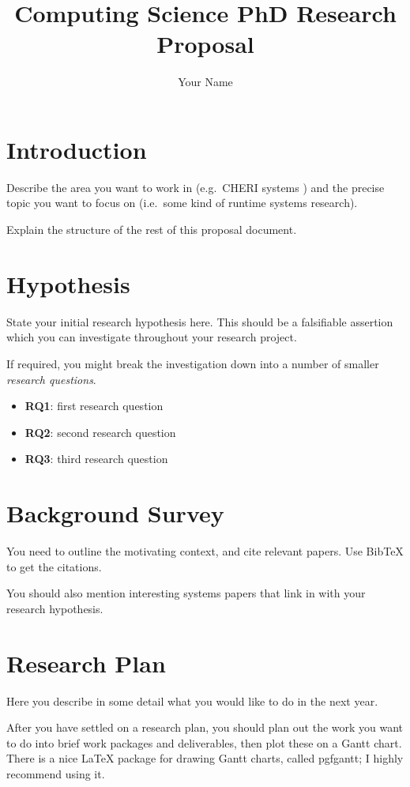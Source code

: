 \documentclass[]{article}
\title{Computing Science PhD Research Proposal}
\author{Your Name}
\begin{document}
\maketitle

\section{Introduction}
\label{sec:intro}

Describe the area you want to work in (e.g.\ CHERI systems \cite{woodruff2014cheri,watson2020cheri})
and the precise topic you want to focus on (i.e.\ some kind of runtime
systems research).

Explain the structure of the rest of this proposal document.

\section{Hypothesis}
\label{sec:hyp}

State your initial research hypothesis here. This should be a falsifiable
assertion which you can investigate throughout your research project.

If required, you might break the investigation down into a number of
smaller \textit{research questions}.

\begin{itemize}
\item \textbf{RQ1}: first research question
\item \textbf{RQ2}: second research question
\item \textbf{RQ3}: third research question
\end{itemize}



\section{Background Survey}
\label{sec:bg}

You need to outline the motivating context, and cite relevant papers.
Use BibTeX to get the citations.

You should also mention interesting systems papers that link in
with your research hypothesis.

\section{Research Plan}
\label{sec:plan}

Here you describe in some detail what you would like to do in the next
year.



After you have settled on a research plan, you should plan out the work you
want to do into brief work packages and deliverables, then plot these on a
Gantt chart. There is a nice LaTeX package for drawing Gantt charts, called
pgfgantt; I highly recommend using it.




\end{document}
